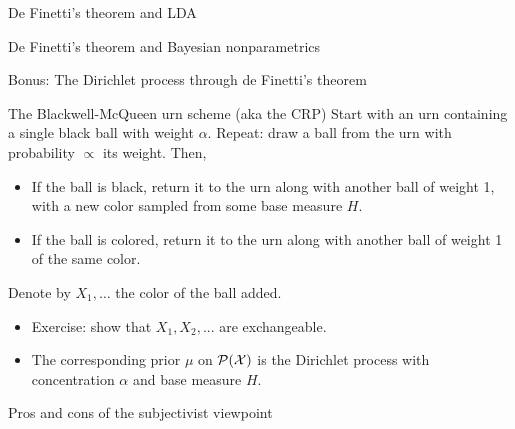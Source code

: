\documentclass[10pt]{beamer}
\begin{document}
\begin{frame}{De Finetti's theorem and LDA}
\end{frame}

\begin{frame}{De Finetti's theorem and Bayesian nonparametrics}
\end{frame}

\begin{frame}{Bonus: The Dirichlet process through de Finetti's theorem}

\begin{block}{The Blackwell-McQueen urn scheme (aka the CRP)}
  Start with an urn containing a single black ball with weight $\alpha$. Repeat: draw a ball from the urn with probability $\propto$ its weight. Then,
  \begin{itemize}
    \item If the ball is black, return it to the urn along with another ball of weight 1, with a new color sampled from some base measure $H$.
    \item If the ball is colored, return it to the urn along with another ball of weight 1 of the same color.
  \end{itemize}
  Denote by $X_1,\dots$ the color of the ball added.
\end{block}
\vfill
\begin{itemize}
  \item Exercise: show that $X_1,X_2,...$ are exchangeable.
  \item The corresponding prior $\mu$ on $\mathcal{P}(\mathcal{X})$ is the Dirichlet process with concentration $\alpha$ and base measure $H$.
\end{itemize}
\end{frame}

\begin{frame}{Pros and cons of the subjectivist viewpoint}
\end{frame}
\end{document}
